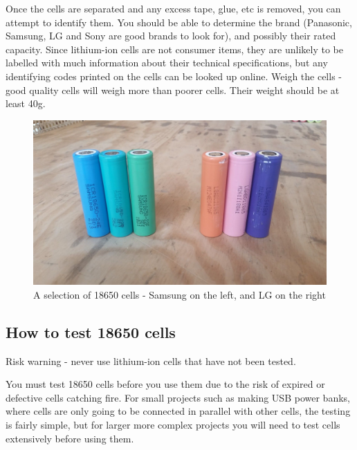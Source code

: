 \documentclass{article}
\theoremstyle{definition}
\theoremstyle{definition}
\theoremstyle{remark}
\begin{document}
    Once the cells are separated and any excess tape, glue, etc is removed, you can attempt to identify them. You should be able to determine the brand (Panasonic, Samsung, LG and Sony are good brands to look for), and possibly their rated capacity. Since lithium-ion cells are not consumer items, they are unlikely to be labelled with much information about their technical specifications, but any identifying codes printed on the cells can be looked up online. Weigh the cells - good quality cells will weigh more than poorer cells. Their weight should be at least 40g.

    \begin{figure}[!ht]
      \centering
      \includegraphics[width=0.4\paperwidth]{Images/image_5_4_(samsung_lg_cells).png}
      \caption*{\centering A selection of 18650 cells - Samsung on the left, and LG on the right}
    \end{figure}


  \subsection{How to test 18650 cells} %
  \label{sub:how_to_test_18650_cells}

    Risk warning - never use lithium-ion cells that have not been tested.

    You must test 18650 cells before you use them due to the risk of expired or defective cells catching fire. For small projects such as making USB power banks, where cells are only going to be connected in parallel with other cells, the testing is fairly simple, but for larger more complex projects you will need to test cells extensively before using them.
\end{document}
